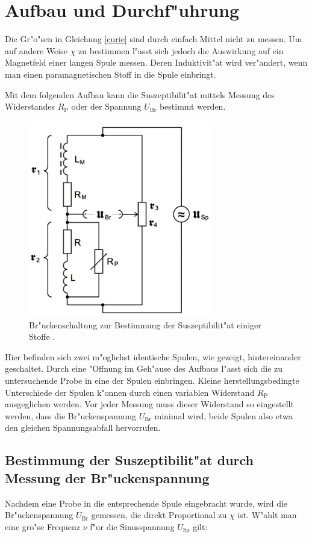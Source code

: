 \section{Aufbau und Durchf"uhrung}
	\label{sec:durchfuehrung}

	Die Gr"o"sen in Gleichung \eqref{curie} sind durch einfach Mittel nicht zu messen.
	Um auf andere Weise $\chi$ zu bestimmen l"asst sich jedoch die Auswirkung auf ein Magnetfeld einer langen Spule messen.
	Deren Induktivit"at wird ver"andert, wenn man einen paramagnetischen Stoff in die Spule einbringt.

	Mit dem folgenden Aufbau kann die Suszeptibilit"at mittels Messung des Widerstandes $R_\mathrm{P}$ oder der Spannung $U_\mathrm{Br}$ bestimmt werden.

	\begin{figure}[h!]
		\centering
		\includegraphics[width = 8cm]{img/aufbau.JPG}
		\caption{Br"uckenschaltung zur Bestimmung der Suszeptibilit"at einiger Stoffe \cite{anleitung}.}
		\label{fig:brueckenschaltung}
	\end{figure}

	\clearpage

	Hier befinden sich zwei m"oglichst identische Spulen, wie gezeigt, hintereinander geschaltet.
	Durch eine "Offnung im Geh"ause des Aufbaus l"asst sich die zu untersuchende Probe in eine der Spulen einbringen.
	Kleine herstellungsbedingte Unterschiede der Spulen k"onnen durch einen variablen Widerstand $R_\mathrm{P}$ ausgeglichen werden.
	Vor jeder Messung muss dieser Widerstand so eingestellt werden, dass die Br"uckenspannung $U_\mathrm{Br}$ minimal wird, beide Spulen also etwa den gleichen Spannungsabfall hervorrufen.

	\subsection{Bestimmung der Suszeptibilit"at durch Messung der Br"uckenspannung}
		\label{subsec:messung_u}
		Nachdem eine Probe in die entsprechende Spule eingebracht wurde, wird die Br"uckenspannung $U_\mathrm{Br}$ gemessen, die direkt Proportional zu $\chi$ ist.
		W"ahlt man eine gro"se Frequenz $\nu$ f"ur die Sinusspannung $U_\mathrm{Sp}$ gilt:

